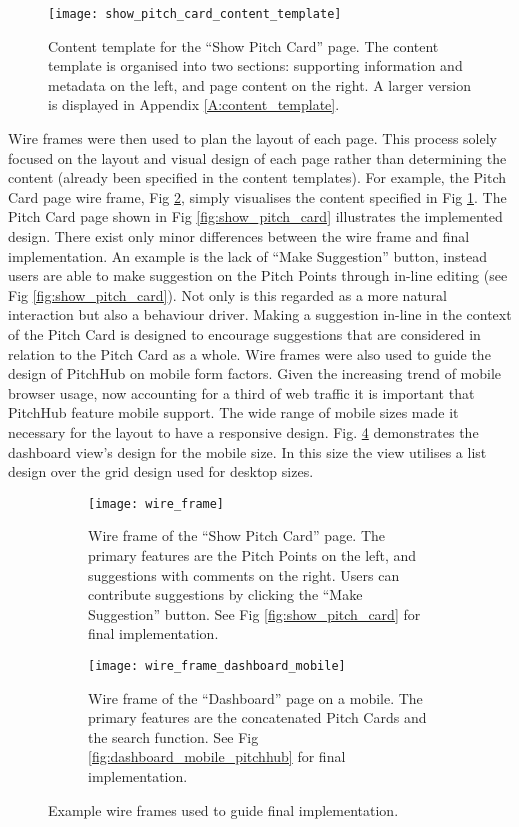 \begin{figure}[ht]
    \centering
    \texttt{[image: show\_pitch\_card\_content\_template]}
    \caption{Content template for the ``Show Pitch Card'' page. The content template is organised into two sections: supporting information and metadata on the left, and page content on the right. A larger version is displayed in Appendix \ref{A:content_template}.}
    \label{fig:content_template}
\end{figure}

Wire frames were then used to plan the layout of each page. This process solely focused on the layout and visual design of each page rather than determining the content (already been specified in the content templates). For example, the Pitch Card page wire frame, Fig \ref{fig:wire_frame}, simply visualises the content specified in Fig \ref{fig:content_template}. The Pitch Card page shown in Fig \ref{fig:show_pitch_card} illustrates the implemented design. There exist only minor differences between the wire frame and final implementation. An example is the lack of ``Make Suggestion'' button, instead users are able to make suggestion on the Pitch Points through in-line editing (see Fig \ref{fig:show_pitch_card}). Not only is this regarded as a more natural interaction but also a behaviour driver. Making a suggestion in-line in the context of the Pitch Card is designed to encourage suggestions that are considered in relation to the Pitch Card as a whole.
Wire frames were also used to guide the design of PitchHub on mobile form factors. Given the increasing trend of mobile browser usage, now accounting for a third of web traffic \cite{Mobile_rise:online} it is important that PitchHub feature mobile support. The wide range of mobile sizes made it necessary for the layout to have a responsive design. Fig. \ref{fig:wire_frame_mobile} demonstrates the dashboard view's design for the mobile size. In this size the view utilises a list design over the grid design used for desktop sizes. 

\begin{figure}[ht]
  \begin{subfigure}[t]{.45\textwidth}
  \centering
    \texttt{[image: wire\_frame]}
    \caption{Wire frame of the ``Show Pitch Card'' page. The primary features are the Pitch Points on the left, and suggestions with comments on the right. Users can contribute suggestions by clicking the ``Make Suggestion'' button. See Fig \ref{fig:show_pitch_card} for final implementation.}
    \label{fig:wire_frame}
  \end{subfigure}\hfill
  \begin{subfigure}[t]{.45\textwidth}
  \centering
    \texttt{[image: wire\_frame\_dashboard\_mobile]}
    \caption{Wire frame of the ``Dashboard'' page on a mobile. The primary features are the concatenated Pitch Cards and the search function. See Fig \ref{fig:dashboard_mobile_pitchhub} for final implementation.}
    \label{fig:wire_frame_mobile}
  \end{subfigure}
  \caption{Example wire frames used to guide final implementation.}
\end{figure}

